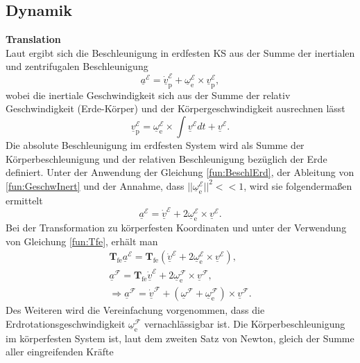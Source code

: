 \subsection{Dynamik}
\textbf{Translation}\\
Laut \cite{FlugmechanikBuch} ergibt sich die Beschleunigung in erdfesten KS  aus der Summe der inertialen und zentrifugalen Beschleunigung
\begin{equation}
\label{fun:BeschlErd}
\underline{a}^\mathcal{E} = \underline{\dot{v}}^\mathcal{E}_\mathrm{p} + \underline{\omega}^\mathcal{E}_\mathrm{e}\times \underline{v}^\mathcal{E}_\mathrm{p},
\end{equation}
wobei die inertiale Geschwindigkeit sich aus der Summe der relativ Geschwindigkeit (Erde-Körper) und der Körpergeschwindigkeit ausrechnen lässt
\begin{equation}
\label{fun:GeschwInert}
\underline{v}^\mathcal{E}_\mathrm{p} = \underline{\omega}^\mathcal{E}_\mathrm{e}\times \int \underline{v}^\mathcal{E} dt + \underline{v}^\mathcal{E}.
\end{equation}
Die absolute Beschleunigung im erdfesten System wird als Summe der Körperbeschleunigung  und der relativen Beschleunigung bezüglich der Erde definiert. Unter der Anwendung der Gleichung \eqref{fun:BeschlErd}, der Ableitung von \eqref{fun:GeschwInert} und der Annahme, dass $||\underline{\omega}_\mathrm{e}^\mathcal{E}||^2 <<1$, wird sie folgendermaßen ermittelt 
\begin{equation}
\label{fun:a}
\underline{a}^\mathcal{E} = \underline{\dot{v}}^\mathcal{E} + 2\underline{\omega}_\mathrm{e}^\mathcal{E} \times \underline{v}^\mathcal{E}.
\end{equation}
Bei der Transformation zu körperfesten Koordinaten und unter der Verwendung von Gleichung \eqref{fun:Tfe}, erhält man
\begin{align}
\textbf{T}_\mathrm{fe}\underline{a}^\mathcal{E} = \textbf{T}_\mathrm{fe}(\underline{\dot{v}}^\mathcal{E} + 2\underline{\omega}_\mathrm{e}^\mathcal{E} \times \underline{v}^\mathcal{E}),\\
\underline{a}^\mathcal{F} = \textbf{T}_\mathrm{fe}\underline{\dot{v}}^\mathcal{E} +  2\underline{\omega}_\mathrm{e}^\mathcal{F} \times \underline{v}^\mathcal{F},\\
\label{fun:a}
\Rightarrow \underline{a}^\mathcal{F} = \underline{\dot{v}}^\mathcal{F} + (\underline{\omega}^\mathcal{F}+\underline{\omega}_\mathrm{e}^\mathcal{F})\times \underline{v}^\mathcal{F}.
\end{align}
Des Weiteren wird die Vereinfachung vorgenommen, dass die Erdrotationsgeschwindigkeit $\underline{\omega}_\mathrm{e}^\mathcal{F}$ vernachlässigbar ist. Die Körperbeschleunigung im körperfesten System ist, laut dem zweiten Satz von Newton, gleich der Summe aller eingreifenden Kräfte 
